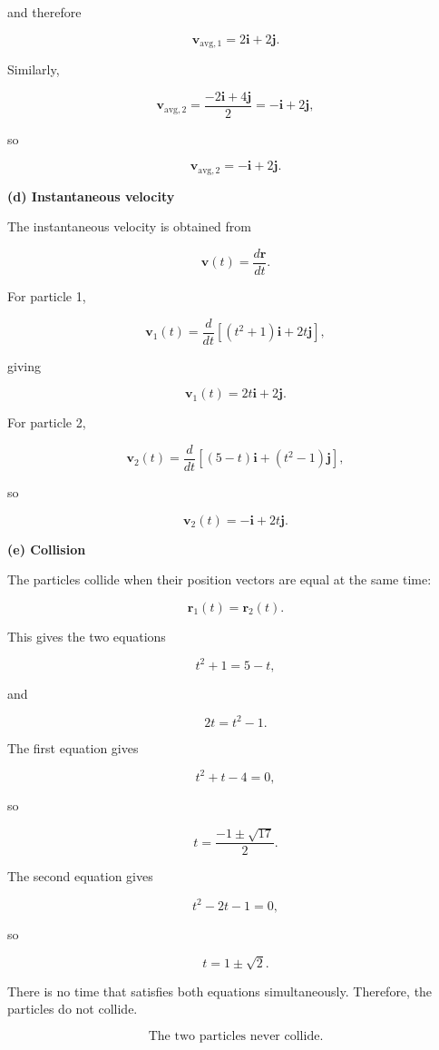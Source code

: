 \documentclass[../main.tex]{subfiles}
\theoremstyle{remark}
\begin{document}
and therefore

\[
\boxed{
\mathbf{v}_{\mathrm{avg},1}
=
2\mathbf{i}+2\mathbf{j}.
}
\]

Similarly,

\[
\mathbf{v}_{\mathrm{avg},2}
=
\frac{-2\mathbf{i}+4\mathbf{j}}{2}
=
-\mathbf{i}+2\mathbf{j},
\]

so

\[
\boxed{
\mathbf{v}_{\mathrm{avg},2}
=
-\mathbf{i}+2\mathbf{j}.
}
\]

\textbf{(d) Instantaneous velocity}

The instantaneous velocity is obtained from

\[
\mathbf{v}(t)=\frac{d\mathbf{r}}{dt}.
\]

For particle 1,

\[
\mathbf{v}_1(t)
=
\frac{d}{dt}
\left[
(t^2+1)\mathbf{i}+2t\mathbf{j}
\right],
\]

giving

\[
\boxed{
\mathbf{v}_1(t)
=
2t\mathbf{i}+2\mathbf{j}.
}
\]

For particle 2,

\[
\mathbf{v}_2(t)
=
\frac{d}{dt}
\left[
(5-t)\mathbf{i}+(t^2-1)\mathbf{j}
\right],
\]

so

\[
\boxed{
\mathbf{v}_2(t)
=
-\mathbf{i}+2t\mathbf{j}.
}
\]

\textbf{(e) Collision}

The particles collide when their position vectors are equal at the same time:

\[
\mathbf{r}_1(t)=\mathbf{r}_2(t).
\]

This gives the two equations

\[
t^2+1=5-t,
\]

and

\[
2t=t^2-1.
\]

The first equation gives

\[
t^2+t-4=0,
\]

so

\[
t=\frac{-1\pm\sqrt{17}}{2}.
\]

The second equation gives

\[
t^2-2t-1=0,
\]

so

\[
t=1\pm\sqrt{2}.
\]

There is no time that satisfies both equations simultaneously. Therefore, the particles do not collide.

\[
\boxed{\text{The two particles never collide.}}
\]
\end{document}

